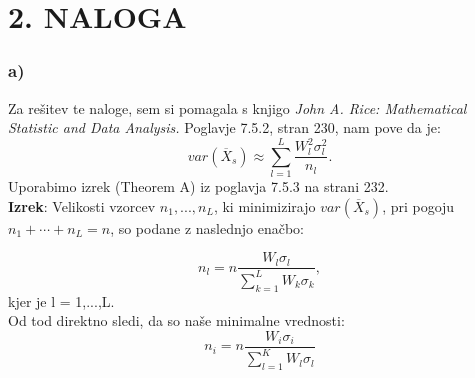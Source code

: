 \documentclass{article}
\begin{document}
\section*{2. NALOGA}
\subsubsection*{a)}
Za rešitev te naloge, sem si pomagala s knjigo \textit{John A. Rice: Mathematical Statistic and Data Analysis.}
Poglavje 7.5.2, stran 230, nam pove da je:
\begin{equation*}
var(\overline{X}_s) \approx \sum_{l=1}^L \frac{W_l^2 \sigma_l^2}{n_l}.
\end{equation*}
Uporabimo izrek (Theorem A) iz poglavja 7.5.3 na strani 232. \\
\textbf{Izrek}: Velikosti vzorcev $n_1,...,n_L$, ki minimizirajo $var(\overline{X}_s)$, pri pogoju $n_1+\cdots + n_L = n$, so podane z naslednjo enačbo:

\begin{equation*}
n_l = n\frac{W_l \sigma_l}{\sum_{k=1}^L W_k\sigma_k},
\end{equation*}
kjer je l = 1,...,L.\\

Od tod direktno sledi, da so naše minimalne vrednosti:
\begin{equation*}
n_i = n \frac{W_i \sigma_i}{\sum_{l=1}^K W_l \sigma_l}
\end{equation*}
\end{document}
